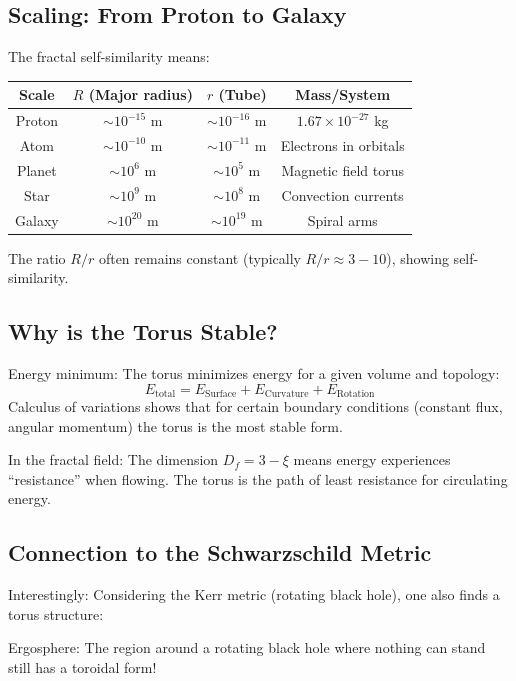 \subsection{Scaling: From Proton to Galaxy}
The fractal self-similarity means:
\begin{table}[H]
	\centering
	\begin{tabular}{|c|c|c|c|}
		\hline
		Scale & \( R \) (Major radius) & \( r \) (Tube) & Mass/System \\
		\hline
		Proton & \( \sim 10^{-15} \) m & \( \sim 10^{-16} \) m & \( 1.67 \times 10^{-27} \) kg \\
		Atom & \( \sim 10^{-10} \) m & \( \sim 10^{-11} \) m & Electrons in orbitals \\
		Planet & \( \sim 10^{6} \) m & \( \sim 10^{5} \) m & Magnetic field torus \\
		Star & \( \sim 10^{9} \) m & \( \sim 10^{8} \) m & Convection currents \\
		Galaxy & \( \sim 10^{20} \) m & \( \sim 10^{19} \) m & Spiral arms \\
		\hline
	\end{tabular}
\end{table}
The ratio \( R/r \) often remains constant (typically \( R/r \approx 3-10 \)), showing self-similarity.

\subsection{Why is the Torus Stable?}
Energy minimum:
The torus minimizes energy for a given volume and topology:
\[
E_{\text{total}} = E_{\text{Surface}} + E_{\text{Curvature}} + E_{\text{Rotation}}
\]
Calculus of variations shows that for certain boundary conditions (constant flux, angular momentum) the torus is the most stable form.

In the fractal field:
The dimension \( D_f = 3 - \xi \) means energy experiences ``resistance'' when flowing. The torus is the path of least resistance for circulating energy.

\subsection{Connection to the Schwarzschild Metric}
Interestingly: Considering the Kerr metric (rotating black hole), one also finds a torus structure:

Ergosphere: The region around a rotating black hole where nothing can stand still has a toroidal form!

